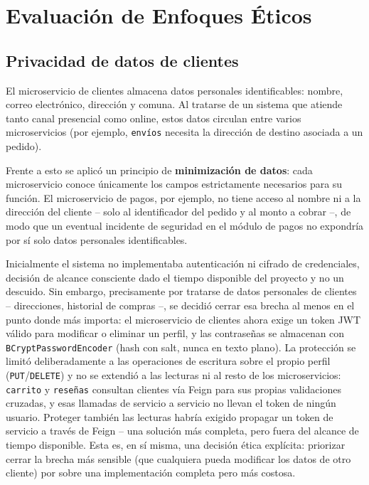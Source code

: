 \chapter{Evaluación de Enfoques Éticos}
\label{ch:etica}

\section{Privacidad de datos de clientes}

El microservicio de clientes almacena datos personales identificables: nombre, correo
electrónico, dirección y comuna. Al tratarse de un sistema que atiende tanto canal
presencial como online, estos datos circulan entre varios microservicios (por ejemplo,
\texttt{envíos} necesita la dirección de destino asociada a un pedido).

Frente a esto se aplicó un principio de \textbf{minimización de datos}: cada
microservicio conoce únicamente los campos estrictamente necesarios para su función. El
microservicio de pagos, por ejemplo, no tiene acceso al nombre ni a la dirección del
cliente -- solo al identificador del pedido y al monto a cobrar --, de modo que un
eventual incidente de seguridad en el módulo de pagos no expondría por sí solo datos
personales identificables.

Inicialmente el sistema no implementaba autenticación ni cifrado de credenciales,
decisión de alcance consciente dado el tiempo disponible del proyecto y no un descuido.
Sin embargo, precisamente por tratarse de datos personales de clientes -- direcciones,
historial de compras --, se decidió cerrar esa brecha al menos en el punto donde más
importa: el microservicio de clientes ahora exige un token JWT válido para modificar o
eliminar un perfil, y las contraseñas se almacenan con \texttt{BCryptPasswordEncoder}
(hash con salt, nunca en texto plano). La protección se limitó deliberadamente a las
operaciones de escritura sobre el propio perfil (\texttt{PUT}/\texttt{DELETE}) y no se
extendió a las lecturas ni al resto de los microservicios: \texttt{carrito} y
\texttt{reseñas} consultan clientes vía Feign para sus propias validaciones cruzadas, y
esas llamadas de servicio a servicio no llevan el token de ningún usuario. Proteger
también las lecturas habría exigido propagar un token de servicio a través de Feign --
una solución más completa, pero fuera del alcance de tiempo disponible. Esta es, en sí
misma, una decisión ética explícita: priorizar cerrar la brecha más sensible (que
cualquiera pueda modificar los datos de otro cliente) por sobre una implementación
completa pero más costosa.


